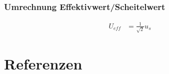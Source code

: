 
\begin{frame}
  \frametitle{Umrechnung Effektivwert/Scheitelwert}
  \begin{align}
    U_{eff} & = \frac{1}{\sqrt{2}} u_{s}
  \end{align}
\end{frame}

\section*{Referenzen}


